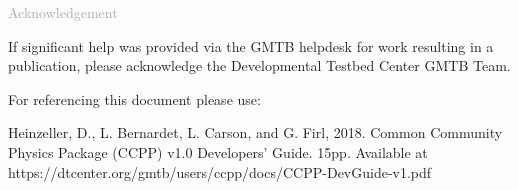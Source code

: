 \begin{titlepage}
\vspace*{0.5cm}
\noindent

\begin{flushleft}
\textcolor{darkgray}{\LARGE Acknowledgement}
\vspace*{1cm}\par

If significant help was provided via the GMTB helpdesk for work resulting in a publication, please acknowledge the Developmental Testbed Center GMTB Team.\\
\vspace*{1cm}\par
For referencing this document please use:\\ 
\vspace*{1cm}\par
Heinzeller, D., L. Bernardet, L. Carson, and G. Firl, 2018. Common Community Physics Package (CCPP) v1.0 Developers' Guide. 15pp. Available at https://dtcenter.org/gmtb/users/ccpp/docs/CCPP-DevGuide-v1.pdf

\end{flushleft}
\end{titlepage}
\pagebreak{}




